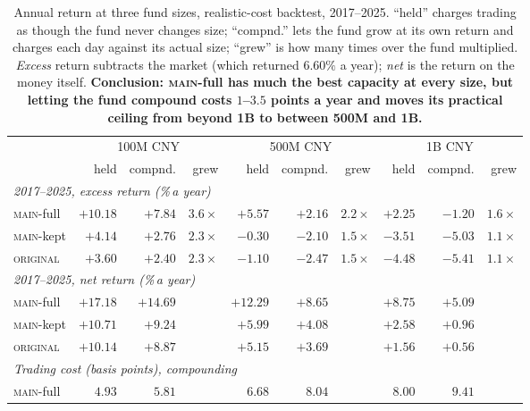 \documentclass[11pt]{article}
\newcommand{\main}{\textsc{main}}
\newcommand{\orig}{\textsc{original}}
\begin{document}
\begin{table}[h]
\centering\small
\setlength{\tabcolsep}{3.5pt}
\begin{tabular}{lrrrrrrrrr}
\toprule
& \multicolumn{3}{c}{100M CNY} & \multicolumn{3}{c}{500M CNY} & \multicolumn{3}{c}{1B CNY} \\
\cmidrule(lr){2-4}\cmidrule(lr){5-7}\cmidrule(lr){8-10}
& held & compnd. & grew & held & compnd. & grew & held & compnd. & grew \\
\midrule
\multicolumn{10}{l}{\emph{2017--2025, excess return (\%\,a year)}} \\
\main{}-full & $+10.18$ & $\bm{+7.84}$ & $3.6\times$ & $+5.57$ & $\bm{+2.16}$ & $2.2\times$ & $+2.25$ & $\bm{-1.20}$ & $1.6\times$ \\
\main{}-kept & $+4.14$ & $+2.76$ & $2.3\times$ & $-0.30$ & $-2.10$ & $1.5\times$ & $-3.51$ & $-5.03$ & $1.1\times$ \\
\orig{}      & $+3.60$ & $+2.40$ & $2.3\times$ & $-1.10$ & $-2.47$ & $1.5\times$ & $-4.48$ & $-5.41$ & $1.1\times$ \\
\midrule
\multicolumn{10}{l}{\emph{2017--2025, net return (\%\,a year)}} \\
\main{}-full & $+17.18$ & $\bm{+14.69}$ & & $+12.29$ & $\bm{+8.65}$ & & $+8.75$ & $\bm{+5.09}$ & \\
\main{}-kept & $+10.71$ & $+9.24$ & & $+5.99$ & $+4.08$ & & $+2.58$ & $+0.96$ & \\
\orig{}      & $+10.14$ & $+8.87$ & & $+5.15$ & $+3.69$ & & $+1.56$ & $+0.56$ & \\
\midrule
\multicolumn{10}{l}{\emph{Trading cost (basis points), compounding}} \\
\main{}-full & $4.93$ & $5.81$ & & $6.68$ & $8.04$ & & $8.00$ & $9.41$ & \\
\bottomrule
\end{tabular}
\caption{Annual return at three fund sizes, realistic-cost backtest, 2017--2025.
``held'' charges trading as though the fund never changes size; ``compnd.'' lets the
fund grow at its own return and charges each day against its actual size; ``grew'' is
how many times over the fund multiplied. \emph{Excess} return subtracts the market
(which returned $6.60\%$ a year); \emph{net} is the return on the money itself.
\textbf{Conclusion: \main{}-full has much the best capacity at every size, but letting
the fund compound costs $1$--$3.5$ points a year and moves its practical ceiling from
beyond 1B to between 500M and 1B.}}
\label{tab:capacity}
\end{table}
\end{document}
